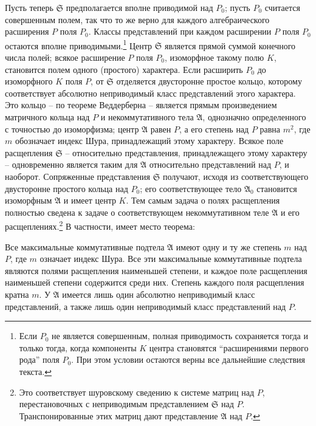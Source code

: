 \documentclass[11pt]{article}
\newcommand{\mS}{\mathfrak{S}}
\newcommand{\mA}{\mathfrak{A}}
\begin{document}
\noindent Пусть теперь $\mS$ предполагается вполне приводимой над $P_0$; пусть $P_0$ считается совершенным полем, так что то же верно для каждого алгебраического расширения $P$ поля $P_0$. Классы представлений при каждом расширении $P$ поля $P_0$ остаются вполне приводимыми.\footnote{Если $P_0$ не является совершенным, полная приводимость сохраняется тогда и только тогда, когда компоненты $K$ центра становятся “расширениями первого рода” поля $P_0$. При этом условии остаются верны все дальнейшие следствия текста.} Центр $\mS$ является прямой суммой конечного числа полей; всякое расширение $P$ поля $P_0$, изоморфное такому полю $K$, становится полем одного (простого) характера. Если расширить $P_0$ до изоморфного $K$ поля $P$, от $\mS$ отделяется двусторонне простое кольцо, которому соответствует абсолютно неприводимый класс представлений этого характера. Это кольцо -- по теореме Веддерберна -- является прямым произведением матричного кольца над $P$ и некоммутативного тела $\mA$, однозначно определенного с точностью до изоморфизма; центр $\mA$ равен $P$, а его степень над $P$ равна $m^2$, где $m$ обозначает индекс Шура, принадлежащий этому характеру. Всякое поле расщепления $\mS$ -- относительно представления, принадлежащего этому характеру -- одновременно является таким для $\mA$ относительно представлений над $P$, и наоборот. Сопряженные представления $\mS$ получают, исходя из соответствующего двусторонне простого кольца над $P_0$; его соответствующее тело $\mA_0$ становится изоморфным $\mA$ и имеет центр $K$. Тем самым задача о полях расщепления полностью сведена к задаче о соответствующем некоммутативном теле $\mA$ и его расщеплениях.\footnote{Это соответствует шуровскому сведению к системе матриц над $P$, перестановочных с неприводимым представлением $\mS$ над $P$. Транспонированные этих матриц дают представление $\mA$ над $P$.} В частности, имеет место теорема:

\medskip

\noindent Все максимальные коммутативные подтела $\mA$ имеют одну и ту же степень $m$ над $P$, где $m$ означает индекс Шура. Все эти максимальные коммутативные подтела являются полями расщепления наименьшей степени, и каждое поле расщепления наименьшей степени содержится среди них. Степень каждого поля расщепления кратна $m$. У $\mA$ имеется лишь один абсолютно неприводимый класс представлений, а также лишь один неприводимый класс представлений над $P$.
\end{document}
